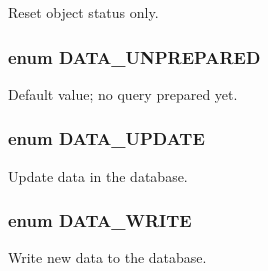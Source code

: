 Reset object status only. 

\hypertarget{class_8datahandler_8php_21c8184f96d445f8f608321e0e8fffc9}{
\subsubsection{\setlength{\rightskip}{0pt plus 5cm}enum {\bf DATA\_\-UNPREPARED}}}
\label{class_8datahandler_8php_21c8184f96d445f8f608321e0e8fffc9}


Default value; no query prepared yet. 

\hypertarget{class_8datahandler_8php_9a817a8e9190bfc1eb884f9b4c3cb7c8}{
\subsubsection{\setlength{\rightskip}{0pt plus 5cm}enum {\bf DATA\_\-UPDATE}}}
\label{class_8datahandler_8php_9a817a8e9190bfc1eb884f9b4c3cb7c8}


Update data in the database. 

\hypertarget{class_8datahandler_8php_5d8b54a2eb4767a05a2e577c2db9193a}{
\subsubsection{\setlength{\rightskip}{0pt plus 5cm}enum {\bf DATA\_\-WRITE}}}
\label{class_8datahandler_8php_5d8b54a2eb4767a05a2e577c2db9193a}


Write new data to the database. 

